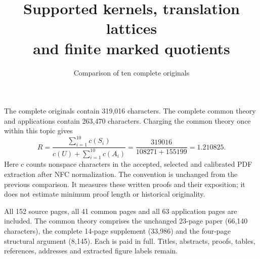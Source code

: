 \documentclass[11pt,a4paper]{article}
\title{Supported kernels, translation lattices\\and finite marked quotients}
\author{Comparison of ten complete originals}\date{}
\begin{document}
\maketitle
The complete originals contain 319,016 characters. The complete common theory and applications contain 263,470 characters. Charging the common theory once within this topic gives
\[
R=\frac{\sum_{i=1}^{10}c(S_i)}{c(U)+\sum_{i=1}^{10}c(A_i)}
=\frac{319016}{108271+155199}
=1.210825.
\]
Here $c$ counts nonspace characters in the accepted, selected and calibrated PDF extraction after NFC normalization. The convention is unchanged from the previous comparison. It measures these written proofs and their exposition; it does not estimate minimum proof length or historical originality.

All 152 source pages, all 41 common pages and all 63 application pages are included. The common theory comprises the unchanged 23-page paper (66,140 characters), the complete 14-page supplement (33,986) and the four-page structural argument (8,145). Each is paid in full. Titles, abstracts, proofs, tables, references, addresses and extracted figure labels remain.
\end{document}
